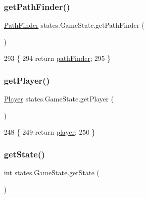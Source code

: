\subsubsection{\texorpdfstring{get\+Path\+Finder()}{getPathFinder()}}
{\footnotesize\ttfamily \mbox{\hyperlink{classentities_1_1_path_finder}{Path\+Finder}} states.\+Game\+State.\+get\+Path\+Finder (\begin{DoxyParamCaption}{ }\end{DoxyParamCaption})\hspace{0.3cm}{\ttfamily [inline]}}


\begin{DoxyCode}
293                                       \{
294         \textcolor{keywordflow}{return} \mbox{\hyperlink{classstates_1_1_game_state_aeaae3c340636293db4737187e847f764}{pathFinder}};
295     \}
\end{DoxyCode}
\mbox{\label{classstates_1_1_game_state_acd86ca53723e41d0bc440cf07c753048}} 
\subsubsection{\texorpdfstring{get\+Player()}{getPlayer()}}
{\footnotesize\ttfamily \mbox{\hyperlink{classentities_1_1_player}{Player}} states.\+Game\+State.\+get\+Player (\begin{DoxyParamCaption}{ }\end{DoxyParamCaption})\hspace{0.3cm}{\ttfamily [inline]}}


\begin{DoxyCode}
248                               \{
249         \textcolor{keywordflow}{return} \mbox{\hyperlink{classstates_1_1_game_state_ae8ec891c55e1c5d43372a289d8a6d87e}{player}};
250     \}
\end{DoxyCode}
\mbox{\label{classstates_1_1_game_state_ab3aace79bbd3da8c4e838ac872ffb2a2}} 
\subsubsection{\texorpdfstring{get\+State()}{getState()}}
{\footnotesize\ttfamily int states.\+Game\+State.\+get\+State (\begin{DoxyParamCaption}{ }\end{DoxyParamCaption})\hspace{0.3cm}{\ttfamily [inline]}}


